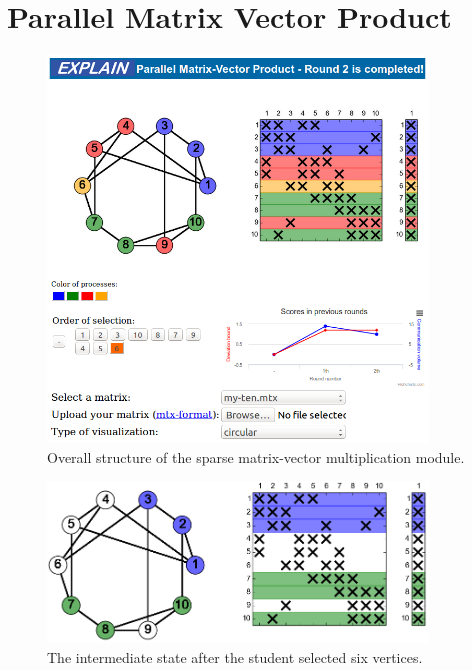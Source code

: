 \documentclass[12pt, oneside]{book}
\begin{document}
\section{Parallel Matrix Vector Product}
\cite{2015:3}
\begin{figure}
\centering
\includegraphics[width=0.9\textwidth]{final}
\caption{Overall structure of the sparse matrix-vector multiplication module.}
\label{f.explain2}
\end{figure}

\begin{figure}
\centering
\includegraphics[width=0.9\textwidth]{twoColors}
\caption{The intermediate state after the student selected six vertices.}
\label{f.beginning}
\end{figure}
\end{document}

